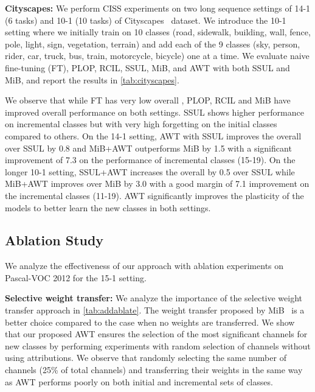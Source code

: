 \noindent\textbf{Cityscapes:} We perform CISS experiments on two long sequence settings of 14-1 (6 tasks) and 10-1 (10 tasks) of Cityscapes~\cite{cordts2016cityscapes} dataset. We introduce the 10-1 setting where we initially train on 10 classes (road, sidewalk, building, wall, fence, pole, light, sign, vegetation, terrain) and add each of the 9 classes (sky, person, rider, car, truck, bus, train, motorcycle, bicycle) one at a time. We evaluate naive fine-tuning (FT), PLOP, RCIL, SSUL, MiB, and AWT with both SSUL and MiB, and report the \miou{} results in \cref{tab:cityscapes}.

We observe that while FT has very low overall \miou{}, PLOP, RCIL and MiB have improved overall performance on both settings. SSUL shows higher performance on incremental classes but with very high forgetting on the initial classes compared to others.
On the 14-1 setting, AWT with SSUL improves the overall \miou{} over SSUL by 0.8  and MiB+AWT outperforms MiB by 1.5  with a significant improvement of 7.3  on the performance of incremental classes (15-19). On the longer 10-1 setting, SSUL+AWT increases the overall \miou{} by 0.5  over SSUL while MiB+AWT improves over MiB by 3.0  with a good margin of 7.1  improvement on the incremental classes (11-19). AWT significantly improves the plasticity of the models to better learn the new classes in both settings.



\subsection{Ablation Study}\label{sec:ablation}
We analyze the effectiveness of our approach with ablation experiments on Pascal-VOC 2012 for the 15-1 setting. 

\noindent\textbf{Selective weight transfer:} We analyze the importance of the selective weight transfer approach in \cref{tab:addablate}. 
The weight transfer proposed by MiB~\cite{cermelli2020modeling} is a better choice compared to the case when no weights are transferred. We show that our proposed AWT ensures the selection of the most significant channels for new classes by performing experiments with random selection of channels without using attributions. We observe that randomly selecting the same number of channels (25\% of total channels) and transferring their weights in the same way as AWT performs poorly on both initial and incremental sets of classes.

